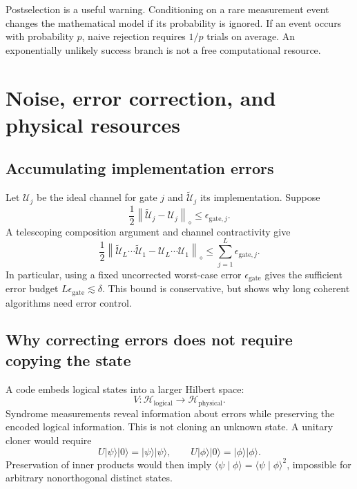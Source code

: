 \documentclass[11pt,a4paper]{article}
\newcommand{\ket}[1]{\lvert #1\rangle}
\newcommand{\braket}[2]{\langle #1\mid #2\rangle}
\newcommand{\norm}[1]{\left\lVert #1\right\rVert}
\theoremstyle{definition}
\theoremstyle{remark}
\numberwithin{equation}{section}
\begin{document}
Postselection is a useful warning. Conditioning on a rare measurement event
changes the mathematical model if its probability is ignored.
If an event occurs with probability $p$, naive rejection requires
$1/p$ trials on average. An exponentially unlikely success branch is not
a free computational resource.

\section{Noise, error correction, and physical resources}\label{sec:noise}
\subsection{Accumulating implementation errors}
Let $\mathcal U_j$ be the ideal channel for gate $j$ and
$\widetilde{\mathcal U}_j$ its implementation. Suppose
\begin{equation}
 \frac12\norm{\widetilde{\mathcal U}_j-\mathcal U_j}_\diamond\leq\epsilon_{\mathrm{gate},j}.
\end{equation}
A telescoping composition argument and channel contractivity give
\begin{equation}\label{eq:noisebound}
 \frac12\left\|
 \widetilde{\mathcal U}_L\cdots\widetilde{\mathcal U}_1-
 \mathcal U_L\cdots\mathcal U_1\right\|_\diamond
 \leq\sum_{j=1}^L\epsilon_{\mathrm{gate},j}.
\end{equation}
In particular, using a fixed uncorrected worst-case error $\epsilon_{\mathrm{gate}}$ gives
the sufficient error budget $L\epsilon_{\mathrm{gate}}\lesssim\delta$. This bound is
conservative, but shows why long coherent algorithms need error control.

\subsection{Why correcting errors does not require copying the state}
A code embeds logical states into a larger Hilbert space:
\begin{equation}
 V:\mathcal H_{\mathrm{logical}}\longrightarrow\mathcal H_{\mathrm{physical}}.
\end{equation}
Syndrome measurements reveal information about errors while preserving
the encoded logical information. This is not cloning an unknown state.
A unitary cloner would require
\begin{equation}
 U\ket{\psi}\ket{0}=\ket{\psi}\ket{\psi},\qquad
 U\ket{\phi}\ket{0}=\ket{\phi}\ket{\phi}.
\end{equation}
Preservation of inner products would then imply
$\braket{\psi}{\phi}=\braket{\psi}{\phi}^2$, impossible for arbitrary
nonorthogonal distinct states.
\end{document}
